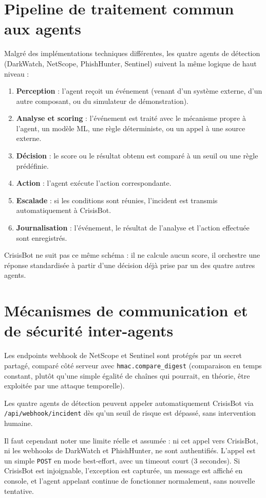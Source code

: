 \documentclass[12pt,a4paper]{report}
\begin{document}
\section{Pipeline de traitement commun aux agents}

Malgré des implémentations techniques différentes, les quatre agents de détection (DarkWatch, NetScope, PhishHunter, Sentinel) suivent la même logique de haut niveau :

\begin{enumerate}[nosep]
\item \textbf{Perception} : l'agent reçoit un événement (venant d'un système externe, d'un autre composant, ou du simulateur de démonstration).
\item \textbf{Analyse et scoring} : l'événement est traité avec le mécanisme propre à l'agent, un modèle ML, une règle déterministe, ou un appel à une source externe.
\item \textbf{Décision} : le score ou le résultat obtenu est comparé à un seuil ou une règle prédéfinie.
\item \textbf{Action} : l'agent exécute l'action correspondante.
\item \textbf{Escalade} : si les conditions sont réunies, l'incident est transmis automatiquement à CrisisBot.
\item \textbf{Journalisation} : l'événement, le résultat de l'analyse et l'action effectuée sont enregistrés.
\end{enumerate}

CrisisBot ne suit pas ce même schéma : il ne calcule aucun score, il orchestre une réponse standardisée à partir d'une décision déjà prise par un des quatre autres agents.

\section{Mécanismes de communication et de sécurité inter-agents}

Les endpoints webhook de NetScope et Sentinel sont protégés par un secret partagé, comparé côté serveur avec \texttt{hmac.compare\_digest} (comparaison en temps constant, plutôt qu'une simple égalité de chaînes qui pourrait, en théorie, être exploitée par une attaque temporelle).

Les quatre agents de détection peuvent appeler automatiquement CrisisBot via \texttt{/api/webhook/incident} dès qu'un seuil de risque est dépassé, sans intervention humaine.

Il faut cependant noter une limite réelle et assumée : ni cet appel vers CrisisBot, ni les webhooks de DarkWatch et PhishHunter, ne sont authentifiés. L'appel est un simple \texttt{POST} en mode best-effort, avec un timeout court (3 secondes). Si CrisisBot est injoignable, l'exception est capturée, un message est affiché en console, et l'agent appelant continue de fonctionner normalement, sans nouvelle tentative.
\end{document}
